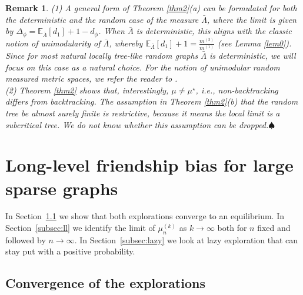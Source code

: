 \documentclass[11pt]{article}
\numberwithin{equation}{section}
\theoremstyle{plain}
\newtheorem{remark}[theorem]{Remark}
\begin{document}
\begin{remark}
{\rm (1) A general form of Theorem \ref{thm2}(a) can be formulated for both the deterministic and the random case of the measure $\bar{\Lambda}$, where the limit is given by $\Delta_{\phi} =\mathbb{E}_{\bar{\Lambda}}[d_{1}]+1-d_{\phi}$. When $\bar{\Lambda}$ is deterministic, this aligns with the classic notion of unimodularity of $\bar{\Lambda}$, whereby $\mathbb{E}_{\bar{\Lambda}}[d_{1}]+1=\frac{m^{(2)}}{m^{(1)}}$ (see Lemma \ref{lem0}). Since for most natural locally tree-like random graphs $\bar{\Lambda}$ is deterministic, we will focus on this case as a natural choice. For the notion of unimodular random measured metric spaces, we refer the reader to \cite{Kh}.\\
(2) Theorem \ref{thm2} shows that, interestingly, $\mu \neq \mu^{\star}$, i.e., non-backtracking differs from backtracking. The assumption in Theorem \ref{thm2}(b) that the random tree be almost surely finite is restrictive, because it means the local limit is a subcritical tree. We do not know whether this assumption can be dropped.}\hfill$\spadesuit$
\end{remark}




\section{Long-level friendship bias for large sparse graphs}
\label{sec:longlevel}

In Section~\ref{subsec:convexpl} we show that both explorations converge to an equilibrium. In Section~\ref{subsec:ll} we identify the limit of $\mu^{(k)}_n$ as $k \to \infty$ both for $n$ fixed and followed by $n\to\infty$. In Section~\ref{subsec:lazy} we look at lazy exploration that can stay put with a positive probability. 


\subsection{Convergence of the explorations}
\label{subsec:convexpl}
\end{document}
